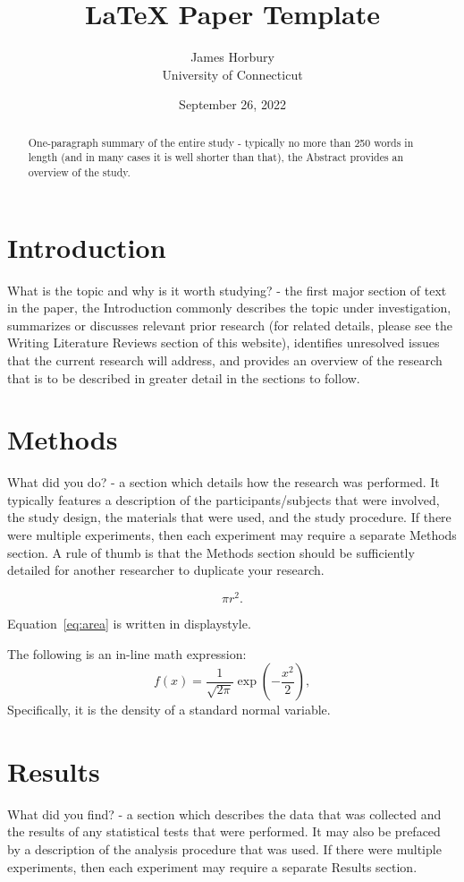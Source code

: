 \documentclass[12pt]{article}
\title{LaTeX Paper Template}
\author{James Horbury\\
    University of Connecticut
}
\date{September 26, 2022}
\begin{document}
\maketitle

\begin{abstract}
One-paragraph summary of the entire study - typically no more than 250 words in length (and in many cases it is well shorter than that), the Abstract provides an overview of the study.
\end{abstract}

\section*{Introduction}
What is the topic and why is it worth studying? - the first major section of text in the paper, the Introduction commonly describes the topic under investigation, summarizes or discusses relevant prior research (for related details, please see the Writing Literature Reviews section of this website), identifies unresolved issues that the current research will address, and provides an overview of the research that is to be described in greater detail in the sections to follow.

\lipsum[1-3]

\section*{Methods}
What did you do? - a section which details how the research was performed.  It typically features a description of the participants/subjects that were involved, the study design, the materials that were used, and the study procedure.  If there were multiple experiments, then each experiment may require a separate Methods section.  A rule of thumb is that the Methods section should be sufficiently detailed for another researcher to duplicate your research.

\begin{equation}
    \label{eq:area}
    \pi r^2.
\end{equation}

Equation~\eqref{eq:area} is written in displaystyle.

The following is an in-line math expression:
\[
  f(x) = \frac{1}{\sqrt{2\pi}} \exp\left( - \frac{x^2}{2} \right),
\]
Specifically, it is the density of a standard normal variable.

\section*{Results}
What did you find? - a section which describes the data that was collected and the results of any statistical tests that were performed.  It may also be prefaced by a description of the analysis procedure that was used. If there were multiple experiments, then each experiment may require a separate Results section.
\end{document}
